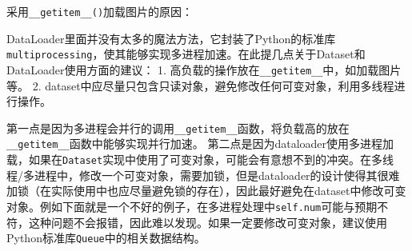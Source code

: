\documentclass[11pt]{article}
\begin{document}
    采用\texttt{\_\_getitem\_\_()}加载图片的原因：

DataLoader里面并没有太多的魔法方法，它封装了Python的标准库\texttt{multiprocessing}，使其能够实现多进程加速。在此提几点关于Dataset和DataLoader使用方面的建议：
1. 高负载的操作放在\texttt{\_\_getitem\_\_}中，如加载图片等。 2.
dataset中应尽量只包含只读对象，避免修改任何可变对象，利用多线程进行操作。

第一点是因为多进程会并行的调用\texttt{\_\_getitem\_\_}函数，将负载高的放在\texttt{\_\_getitem\_\_}函数中能够实现并行加速。
第二点是因为dataloader使用多进程加载，如果在\texttt{Dataset}实现中使用了可变对象，可能会有意想不到的冲突。在多线程/多进程中，修改一个可变对象，需要加锁，但是dataloader的设计使得其很难加锁（在实际使用中也应尽量避免锁的存在），因此最好避免在dataset中修改可变对象。例如下面就是一个不好的例子，在多进程处理中\texttt{self.num}可能与预期不符，这种问题不会报错，因此难以发现。如果一定要修改可变对象，建议使用Python标准库\texttt{Queue}中的相关数据结构。


    
    
    
    
\end{document}
